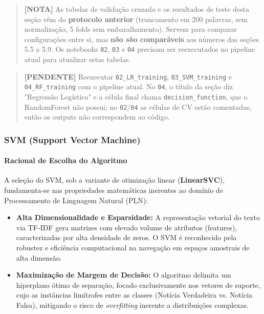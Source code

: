 \documentclass[
  brazilian,
  11pt,
]{article}
\providecommand{\tightlist}{%
  \setlength{\itemsep}{0pt}\setlength{\parskip}{0pt}}
\begin{document}
\begin{quote}
\textbf{{[}NOTA{]}} As tabelas de validação cruzada e os resultados de teste desta seção vêm do \textbf{protocolo anterior} (truncamento em 200 palavras, sem normalização, 5 folds sem embaralhamento). Servem para comparar configurações entre si, mas \textbf{não são comparáveis} aos números das seções 5.5 a 5.9. Os notebooks \texttt{02}, \texttt{03} e \texttt{04} precisam ser reexecutados no pipeline atual para atualizar estas tabelas.
\end{quote}

\begin{quote}
\textbf{{[}PENDENTE{]}} Reexecutar \texttt{02\_LR\_training}, \texttt{03\_SVM\_training} e \texttt{04\_RF\_training} com o pipeline atual. No \texttt{04}, o título da seção diz "Regressão Logística" e a célula final chama \texttt{decision\_function}, que o RandomForest não possui; no \texttt{02}/\texttt{04} as células de CV estão comentadas, então os outputs não correspondem ao código.
\end{quote}

\subsubsection{SVM (Support Vector Machine)}\label{svm-support-vector-machine}

\paragraph{Racional de Escolha do Algoritmo}\label{racional-de-escolha-do-algoritmo}

A seleção do SVM, sob a variante de otimização linear (\textbf{LinearSVC}), fundamenta-se nas propriedades matemáticas inerentes ao domínio de Processamento de Linguagem Natural (PLN):

\begin{itemize}
\tightlist
\item
  \textbf{Alta Dimensionalidade e Esparsidade:} A representação vetorial do texto via TF-IDF gera matrizes com elevado volume de atributos (features), caracterizadas por alta densidade de zeros. O SVM é reconhecido pela robustez e eficiência computacional na navegação em espaços amostrais de alta dimensão.
\item
  \textbf{Maximização de Margem de Decisão:} O algoritmo delimita um hiperplano ótimo de separação, focado exclusivamente nos vetores de suporte, cujo as instâncias limítrofes entre as classes (Notícia Verdadeira vs. Notícia Falsa), mitigando o risco de \emph{overfitting} inerente a distribuições complexas.
\end{itemize}
\end{document}
